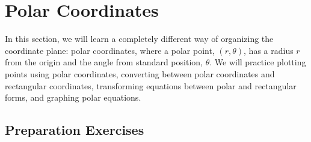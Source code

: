 
\section{Polar Coordinates} \label{section-polar-coordinates}
In this section, we will learn a completely different way of organizing the coordinate plane: polar coordinates, where a polar point, $(r,\theta)$, has a radius $r$ from the origin and the angle from standard position, $\theta$. We will practice plotting points using polar coordinates, converting between polar coordinates and rectangular coordinates, transforming equations between polar and rectangular forms, and graphing polar equations.


\subsection*{Preparation Exercises} \label{preparation-exercises-section-polar-coordinates}


